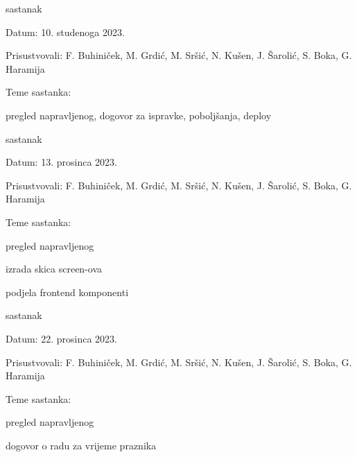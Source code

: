 \begin{packed_enum}
			
									\item  sastanak
			\item[] \begin{packed_item}
				\item Datum: 10. studenoga 2023.
				\item Prisustvovali: F. Buhiniček, M. Grdić, M. Sršić, N. Kušen, J. Šarolić, S. Boka, G. Haramija
				\item Teme sastanka:
				\begin{packed_item}
					\item  pregled napravljenog, dogovor za ispravke, poboljšanja, deploy
				\end{packed_item}
			\end{packed_item}
			
			
			\item  sastanak
			\item[] \begin{packed_item}
				\item Datum: 13. prosinca 2023.
				\item Prisustvovali: F. Buhiniček, M. Grdić, M. Sršić, N. Kušen, J. Šarolić, S. Boka, G. Haramija
				\item Teme sastanka:
				\begin{packed_item}
					\item pregled napravljenog
					\item izrada skica screen-ova
					\item podjela frontend komponenti
				\end{packed_item}
			\end{packed_item}
			
			\item  sastanak
			\item[] \begin{packed_item}
				\item Datum: 22. prosinca 2023.
				\item Prisustvovali: F. Buhiniček, M. Grdić, M. Sršić, N. Kušen, J. Šarolić, S. Boka, G. Haramija
				\item Teme sastanka:
				\begin{packed_item}
					\item  pregled napravljenog
					\item  dogovor o radu za vrijeme praznika
				\end{packed_item}
			\end{packed_item}
			

\end{packed_enum}
